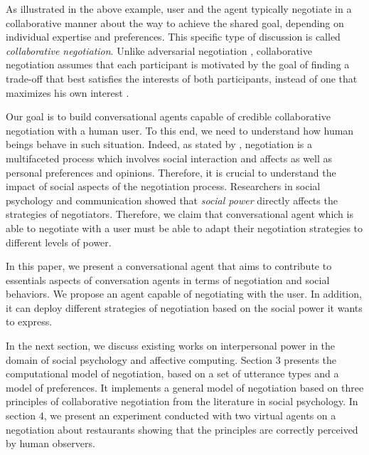 \documentclass{llncs}
\begin{document}
		As illustrated in the above example, user and the agent typically negotiate in a collaborative manner about the way to achieve the shared goal, depending on individual expertise and preferences. This specific type of discussion is called \emph{collaborative negotiation}. Unlike adversarial negotiation \cite{broekens2010affective}, collaborative negotiation assumes that each participant is motivated by the goal of finding a trade-off that best satisfies the interests of both participants, instead of one that maximizes his own interest \cite{sidner1994artificial,chu1995response}.
		
		Our goal is to build conversational agents capable of credible collaborative negotiation with a human user. To this end, we need to understand how human beings behave in such situation. Indeed, as stated by \cite{broekens2010affective}, negotiation is a multifaceted process which involves social interaction and affects as well as personal preferences and opinions. Therefore, it is crucial to understand the impact of social aspects of the negotiation process. Researchers in social psychology and communication \cite{dunbar2005perceptions,de1995impact} showed that \emph{social power} directly  affects the strategies of negotiators. Therefore, we claim that conversational agent which is able to negotiate with a user must be able to adapt their negotiation strategies to different levels of power.
		
		In this paper, we present a conversational agent that aims to contribute to essentials aspects of conversation agents in terms of negotiation and social behaviors. We propose an agent capable of negotiating with the user. In addition, it can deploy different strategies of negotiation based on the social power it wants to express.
		
		 In the next section, we discuss existing works on interpersonal power in the domain of social psychology and affective computing. Section 3 presents the computational model of negotiation, based on a set of utterance types and a model of preferences. It implements a general model of negotiation based on three principles of collaborative negotiation from the literature in social psychology. In section 4, we present an experiment conducted with two virtual agents on a negotiation about restaurants showing that the principles are correctly perceived by human observers.	
		
\end{document}
